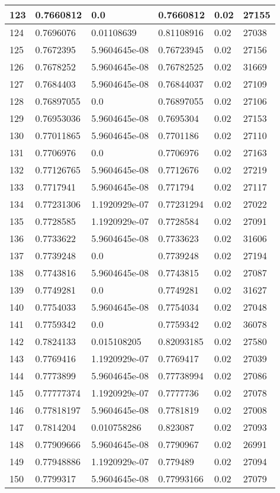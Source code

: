 \begin{longtable}{|l|l|l|l|l|l|}
123 & 0.7660812 & 0.0 & 0.7660812 & 0.02 & 27155 \\ \hline 
124 & 0.7696076 & 0.01108639 & 0.81108916 & 0.02 & 27038 \\ \hline 
125 & 0.7672395 & 5.9604645e-08 & 0.76723945 & 0.02 & 27156 \\ \hline 
126 & 0.7678252 & 5.9604645e-08 & 0.76782525 & 0.02 & 31669 \\ \hline 
127 & 0.7684403 & 5.9604645e-08 & 0.76844037 & 0.02 & 27109 \\ \hline 
128 & 0.76897055 & 0.0 & 0.76897055 & 0.02 & 27106 \\ \hline 
129 & 0.76953036 & 5.9604645e-08 & 0.7695304 & 0.02 & 27153 \\ \hline 
130 & 0.77011865 & 5.9604645e-08 & 0.7701186 & 0.02 & 27110 \\ \hline 
131 & 0.7706976 & 0.0 & 0.7706976 & 0.02 & 27163 \\ \hline 
132 & 0.77126765 & 5.9604645e-08 & 0.7712676 & 0.02 & 27219 \\ \hline 
133 & 0.7717941 & 5.9604645e-08 & 0.771794 & 0.02 & 27117 \\ \hline 
134 & 0.77231306 & 1.1920929e-07 & 0.77231294 & 0.02 & 27022 \\ \hline 
135 & 0.7728585 & 1.1920929e-07 & 0.7728584 & 0.02 & 27091 \\ \hline 
136 & 0.7733622 & 5.9604645e-08 & 0.7733623 & 0.02 & 31606 \\ \hline 
137 & 0.7739248 & 0.0 & 0.7739248 & 0.02 & 27194 \\ \hline 
138 & 0.7743816 & 5.9604645e-08 & 0.7743815 & 0.02 & 27087 \\ \hline 
139 & 0.7749281 & 0.0 & 0.7749281 & 0.02 & 31627 \\ \hline 
140 & 0.7754033 & 5.9604645e-08 & 0.7754034 & 0.02 & 27048 \\ \hline 
141 & 0.7759342 & 0.0 & 0.7759342 & 0.02 & 36078 \\ \hline 
142 & 0.7824133 & 0.015108205 & 0.82093185 & 0.02 & 27580 \\ \hline 
143 & 0.7769416 & 1.1920929e-07 & 0.7769417 & 0.02 & 27039 \\ \hline 
144 & 0.7773899 & 5.9604645e-08 & 0.77738994 & 0.02 & 27086 \\ \hline 
145 & 0.77777374 & 1.1920929e-07 & 0.7777736 & 0.02 & 27078 \\ \hline 
146 & 0.77818197 & 5.9604645e-08 & 0.7781819 & 0.02 & 27008 \\ \hline 
147 & 0.7814204 & 0.010758286 & 0.823087 & 0.02 & 27093 \\ \hline 
148 & 0.77909666 & 5.9604645e-08 & 0.7790967 & 0.02 & 26991 \\ \hline 
149 & 0.77948886 & 1.1920929e-07 & 0.779489 & 0.02 & 27094 \\ \hline 
150 & 0.7799317 & 5.9604645e-08 & 0.77993166 & 0.02 & 27079 \\ \hline 
\end{longtable}